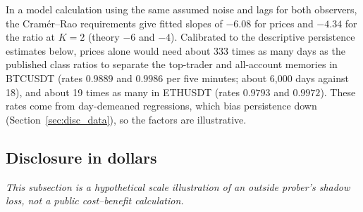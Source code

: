 In a model calculation using the same assumed noise and lags for both observers, the Cram\'er--Rao requirements give fitted slopes of $-6.08$ for prices and $-4.34$ for the ratio at $K=2$ (theory $-6$ and $-4$). Calibrated to the descriptive persistence estimates below, prices alone would need about 333 times as many days as the published class ratios to separate the top-trader and all-account memories in BTCUSDT (rates $0.9889$ and $0.9986$ per five minutes; about 6{,}000 days against 18), and about 19 times as many in ETHUSDT (rates $0.9793$ and $0.9972$). These rates come from day-demeaned regressions, which bias persistence down (Section~\ref{sec:disc_data}), so the factors are illustrative.

\subsection{Disclosure in dollars}\label{sec:disc_dollars}
\emph{This subsection is a hypothetical scale illustration of an outside prober's shadow loss, not a public cost--benefit calculation.}

